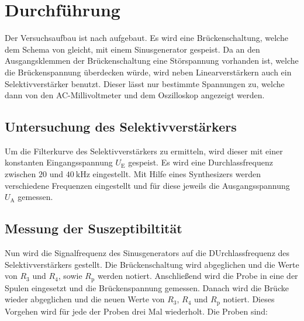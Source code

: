\section{Durchführung}
\label{sec:Durchführung}
Der Versuchsaufbau ist nach %
 aufgebaut. 
 Es wird eine Brückenschaltung, welche dem Schema von %
 gleicht, mit einem Sinusgenerator gespeist.
 Da an den Ausgangsklemmen der Brückenschaltung eine Störspannung vorhanden ist, welche die Brückenspannung überdecken würde, wird neben Linearverstärkern auch ein Selektivverstärker benutzt.
 Dieser lässt nur bestimmte Spannungen zu, welche dann von den AC-Millivoltmeter und dem Oszilloskop angezeigt werden. 

\subsection{Untersuchung des Selektivverstärkers}
Um die Filterkurve des Selektivverstärkers zu ermitteln, wird dieser mit einer konstanten Eingangsspannung $U_{\text{E}}$ gespeist.
Es wird eine Durchlassfrequenz zwischen $\num{20}$ und $\SI{40}{\kilo\hertz}$ eingestellt. 
Mit Hilfe eines Synthesizers werden verschiedene Frequenzen eingestellt und für diese jeweils die Ausgangsspannung $U_{\text{A}}$ gemessen.

\subsection{Messung der Suszeptibiltität}
Nun wird die Signalfrequenz des Sinusgenerators auf die DUrchlassfrequenz des Selektivverstärkers gestellt.
Die Brückenschaltung wird abgeglichen und die Werte von $R_3$ und $R_4$, sowie $R_{\text{p}}$ werden notiert.
Anschließend wird die Probe in eine der Spulen eingesetzt und die Brückenspannung gemessen.
Danach wird die Brücke wieder abgeglichen und die neuen Werte von $R_3$, $R_4$ und $R_{\text{p}}$ notiert.
Dieses Vorgehen wird für jede der Proben drei Mal wiederholt.
Die Proben sind: 